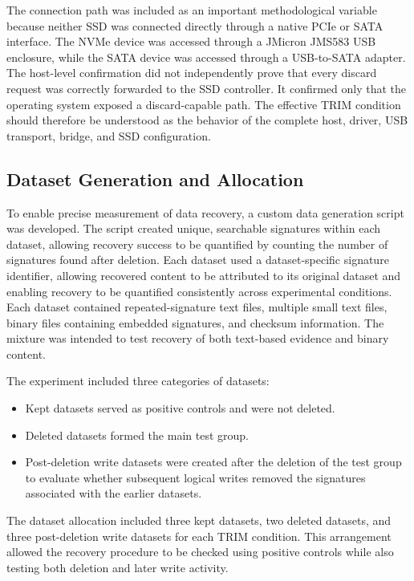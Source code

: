 The connection path was included as an important methodological variable because neither SSD was connected directly through a native PCIe or SATA interface. The NVMe 
device was accessed through a JMicron JMS583 USB enclosure, while the SATA device was accessed through a USB-to-SATA adapter. The host-level confirmation did not 
independently prove that every discard request was correctly forwarded to the SSD controller. It confirmed only that the operating system exposed a discard-capable 
path. The effective TRIM condition should therefore be understood as the behavior of the complete host, driver, USB transport, bridge, and SSD configuration.

\subsection*{Dataset Generation and Allocation}

To enable precise measurement of data recovery, a custom data generation script was developed. The script created unique, searchable signatures within each dataset, allowing 
recovery success to be quantified by counting the number of signatures found after deletion. Each dataset used a dataset-specific signature identifier, allowing recovered 
content to be attributed to its original dataset and enabling recovery to be quantified consistently across experimental conditions. Each dataset contained repeated-signature 
text files, multiple small text files, binary files containing embedded signatures, and checksum information. The mixture was intended to test recovery of both text-based evidence and binary content. 

The experiment included three categories of datasets:
\begin{itemize}
    
\item Kept datasets served as positive controls and were not deleted.

\item Deleted datasets formed the main test group.

\item Post-deletion write datasets were created after the deletion of the test group to evaluate whether subsequent logical writes removed the signatures associated 
with the earlier datasets.

\end{itemize}
The dataset allocation included three kept datasets, two deleted datasets, and three post-deletion write datasets for each TRIM condition. This arrangement allowed 
the recovery procedure to be checked using positive controls while also testing both deletion and later write activity.

